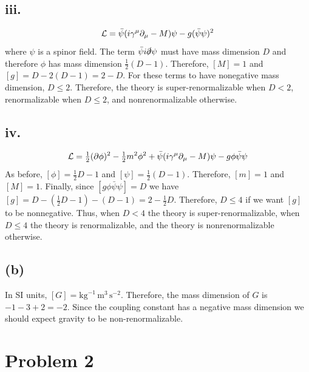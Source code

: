 \documentclass[12pt]{article}
\begin{document}
\subsection*{iii.}

\[ \mathcal{L} = \bar{\psi} ( i \gamma^\mu  \partial_\mu - M) \psi - g (\bar{\psi} \psi)^2 \]
where $\psi$ is a spinor field. The term $\bar{\psi} i \slashed{\partial} \psi$ must have mass dimension $D$ and therefore $\phi$ has mass dimension $\tfrac{1}{2}(D - 1)$. Therefore, $[M] = 1$ and $[g] = D - 2 (D - 1) = 2 - D$. For these terms to have nonegative mass dimension, $D \le 2$. Therefore, the theory is super-renormalizable when $D < 2$, renormalizable when $D \le 2$, and nonrenormalizable otherwise. 

\subsection*{iv.}

\[ \mathcal{L} = \tfrac{1}{2} (\partial \phi)^2 - \tfrac{1}{2} m^2 \phi^2 + \bar{\psi} ( i \gamma^\mu \partial_\mu - M) \psi - g \phi \bar{\psi} \psi \]
As before, $ [ \phi ] = \tfrac{1}{2} D - 1 $ and $[\psi] = \tfrac{1}{2}(D - 1)$. Therefore, $[m] = 1$ and $[M] = 1$. Finally, since $[g \phi \bar{\psi} \psi] = D$ we have $[g] = D - (\tfrac{1}{2} D - 1) - (D - 1) = 2 - \tfrac{1}{2} D$. Therefore, $D \le 4$ if we want $[g]$ to be nonnegative. Thus, when $D < 4$ the theory is super-renormalizable, when $D \le 4$ the theory is renormalizable, and the theory is nonrenormalizable otherwise. 

\subsection*{(b)}

In SI units, $[G] = \mathrm{kg}^{-1} \, \mathrm{m}^3 \, \mathrm{s}^{-2}$. Therefore, the mass dimension of $G$ is $-1 - 3 + 2 = -2$. Since the coupling constant has a negative mass dimension we should expect gravity to be non-renormalizable.  

\section*{Problem 2}
\end{document}
